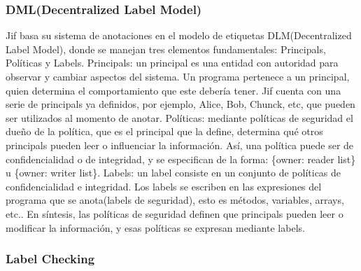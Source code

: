 \subsubsection{DML(Decentralized Label Model)}
Jif basa su sistema de anotaciones en el modelo de etiquetas DLM(Decentralized
Label Model), donde se manejan tres elementos fundamentales: Principals,
Políticas y Labels.\newline
Principals: un principal es una entidad con autoridad para observar y cambiar
aspectos del sistema. Un programa pertenece a un principal, quien determina el
comportamiento que este debería tener. Jif cuenta con una serie de principals ya
definidos, por ejemplo, Alice, Bob, Chunck, etc, que pueden ser
utilizados al momento de anotar.\newline 
Políticas: mediante políticas de seguridad el dueño de la política, que es el
principal que la define, determina qué otros principals pueden leer o
influenciar la información. Así, una política puede ser de confidencialidad o de
integridad, y se especifican de la forma: \{owner: reader list\} u
\{owner: writer list\}.\newline 
Labels: un label consiste en un conjunto de políticas de confidencialidad e
integridad. Los labels se escriben en las expresiones del programa que se
anota(labels de seguridad), esto es métodos, variables, arrays, etc..\newline 
En síntesis, las políticas de seguridad definen que principals pueden leer o
modificar la información, y esas políticas se expresan mediante labels.

\subsubsection{Label Checking}

